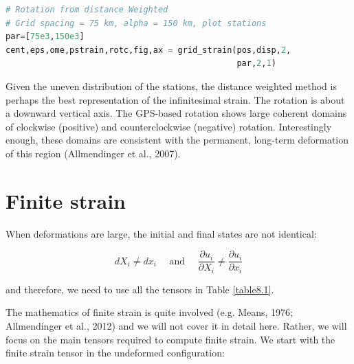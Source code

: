 \documentclass[a4paper , 12pt]{book}
\begin{document}
\begin{center}
\begin{lstlisting}[language=Python, frame=single]
# Rotation from distance Weighted 
# Grid spacing = 75 km, alpha = 150 km, plot stations
par=[75e3,150e3]
cent,eps,ome,pstrain,rotc,fig,ax = grid_strain(pos,disp,2,
                                               par,2,1)
\end{lstlisting}
\end{center}

Given the uneven distribution of the stations, the distance weighted method is perhaps the best representation of  the infinitesimal strain. The rotation is about a downward vertical axis. The GPS-based rotation shows large coherent domains of clockwise (positive) and counterclockwise (negative) rotation. Interestingly enough, these domains are consistent with the permanent, long-term deformation of this region (Allmendinger et al., 2007).

\section{Finite strain}\label{FinStrain}

When deformations are large, the initial and final states are not identical:

\begin{equation}
    d X_{i} \neq d x_{i} \quad \text { and } \quad \frac{\partial u_{i}}{\partial X_{i}} \neq \frac{\partial u_{i}}{\partial x_{i}}
\end{equation}

and therefore, we need to use all the tensors in Table \ref{table8.1}.

The mathematics of finite strain is quite involved (e.g. Means, 1976; Allmendinger et al., 2012) and we will not cover it in detail here. Rather, we will focus on the main tensors required to compute finite strain. We start with the finite strain tensor in the undeformed configuration:
\end{document}
